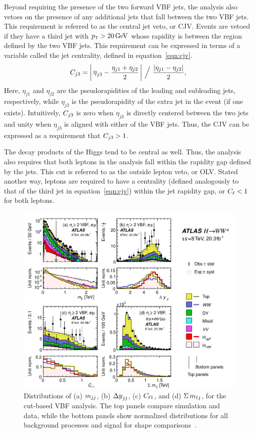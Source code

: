 Beyond requiring the presence of the two forward VBF jets, the analysis also vetoes on the presence of any additional jets that fall between the two VBF jets. This requirement is referred to as the central jet veto, or CJV. Events are vetoed if they have a third jet with $\pT > 20 \GeV$ whose rapidity is between the region defined by the two VBF jets. This requirement can be expressed in terms of a variable called the jet centrality, defined in equation~\ref{eqn:cjv}.
%
\begin{equation}
\cjv = \bigg|\, \etathirdjet - \frac{\eta_{j1} + \eta_{j2}}{2} \,\bigg|\ \Big/\ \frac{\left|\eta_{j1} - \eta_{j2}\right|}{2},
\label{eqn:cjv}
\end{equation}
%
Here, $\eta_{j1}$ and $\eta_{j2}$ are the pseudorapidities of the leading and subleading jets, respectively, while $\eta_{j3}$ is the pseudorapidity of the extra jet in the event (if one exists). Intuitively, $C_{j3}$ is zero when $\eta_{j3}$ is directly centered between the two jets and unity when $\eta_{j3}$ is aligned with either of the VBF jets. Thus, the CJV can be expressed as a requirement that $C_{j3} > 1$. 

The decay products of the Higgs tend to be central as well. Thus, the analysis also requires that both leptons in the analysis fall within the rapidity gap defined by the jets. This cut is referred to as the outside lepton veto, or OLV. Stated another way, leptons are required to have a centrality (defined analogously to that of the third jet in equation~\ref{eqn:cjv}) within the jet rapidity gap, or $C_{\ell} < 1$ for both leptons. 

\begin{figure}
  \centering
  \captionsetup{justification=centering}
  \includegraphics[width=\textwidth]{figures/VBF_vars}
  \caption{Distributions of (a) $m_{jj}$, (b) $\dyjj$, (c) $C_{\ell1}$, and (d) $\Sigma\,m_{\ell j}$, for the cut-based VBF analysis. The top panels compare simulation and data, while the bottom panels show normalized distributions for all background processes and signal for shape comparisons~\cite{WW2015}.}
  \label{fig:vbfvars}
\end{figure}

